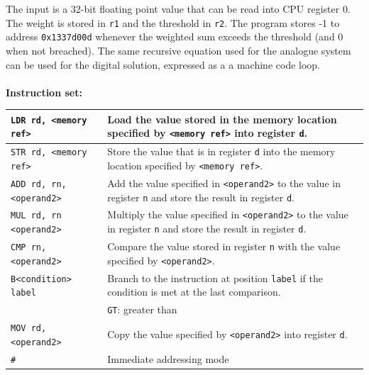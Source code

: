 \documentclass[a4paper, 12pt, oneside]{book}
\begin{document}
The input is a 32-bit floating point value that can be read into CPU register 0. The weight is stored in \texttt{r1} and the threshold in \texttt{r2}. The program stores -1 to address \texttt{0x1337d00d} whenever the weighted sum exceeds the threshold (and 0 when not breached). The same recursive equation used for the analogue system can be used for the digital solution, expressed as a a machine code loop.\\
\\
\textbf{Instruction set:}
\begin{table}[H]
  \centering
  \begin{tabularx}{\textwidth}{|X|X|}
    \hline
    \texttt{LDR rd, <memory ref>}   & Load the value stored in the memory location specified by \texttt{<memory ref>} into register \texttt{d}.                            \\
    \hline
    \texttt{STR rd, <memory ref>}   & Store the value that is in register \texttt{d} into the memory location specified by \texttt{<memory ref>}.                          \\
    \hline
    \texttt{ADD rd, rn, <operand2>} & Add the value specified in \texttt{<operand2>} to the value in register \texttt{n} and store the result in register \texttt{d}.      \\
    \hline
    \texttt{MUL rd, rn <operand2>}  & Multiply the value specified in \texttt{<operand2>} to the value in register \texttt{n} and store the result in register \texttt{d}. \\
    \hline
    \texttt{CMP rn, <operand2>}     & Compare the value stored in register \texttt{n} with the value specified by \texttt{<operand2>}.                                     \\
    \hline
    \texttt{B<condition> label}     & Branch to the instruction at position \texttt{label} if the condition is met at the last comparison.                                 \\
                                    & \texttt{GT}: greater than                                                                                                            \\
    \hline
    \texttt{MOV rd, <operand2>}     & Copy the value specified by \texttt{<operand2>} into register \texttt{d}.                                                            \\
    \hline
    \texttt{\#}                     & Immediate addressing mode                                                                                                            \\
    \hline
  \end{tabularx}
\end{table}
\end{document}
